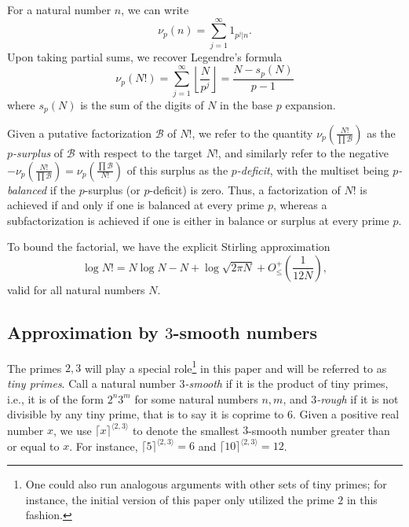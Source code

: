 \documentclass[12pt,a4paper,reqno]{amsart}
\numberwithin{equation}{section}
\theoremstyle{plain}
\theoremstyle{definition}
\newcommand\tuple{{\mathcal B}}
\begin{document}
For a natural number $n$, we can write
\begin{equation}\label{nup-form} 
  \nu_p(n) = \sum_{j=1}^\infty 1_{p^j|n}.
\end{equation}
Upon taking partial sums, we recover Legendre's formula
\begin{equation}\label{legendre}
  \nu_p(N!) = \sum_{j=1}^\infty \left\lfloor \frac{N}{p^j} \right\rfloor = \frac{N - s_p(N)}{p-1}
\end{equation}
where $s_p(N)$ is the sum of the digits of $N$ in the base $p$ expansion.

Given a putative factorization $\tuple$ of $N!$,  
we refer to the quantity $\nu_p\left( \frac{N!}{\prod \tuple} \right)$ as the \emph{$p$-surplus} of $\tuple$ with respect to the target $N!$, and similarly refer to the negative $-\nu_p\left( \frac{N!}{\prod \tuple} \right) = \nu_p\left( \frac{\prod \tuple}{N!} \right)$ of this surplus as the \emph{$p$-deficit}, with the multiset being \emph{$p$-balanced} if the $p$-surplus (or $p$-deficit) is zero.  Thus, a factorization of $N!$ is achieved if and only if one is balanced at every prime $p$, whereas a subfactorization is achieved if one is either in balance or surplus at every prime $p$.

To bound the factorial, we have the explicit Stirling approximation \cite{robbins}
\begin{equation}\label{stirling}
\log N! = N \log N - N + \log \sqrt{2\pi N} + O_\leq^+\left(\frac{1}{12N}\right),
\end{equation}
valid for all natural numbers $N$. 

\subsection{Approximation by \texorpdfstring{$3$}{3}-smooth numbers} 

The primes $2,3$ will play a special role\footnote{One could also run analogous arguments with other sets of tiny primes; for instance, the initial version \cite{tao} of this paper only utilized the prime $2$ in this fashion.} in this paper and will be referred to as \emph{tiny primes}. 
Call a natural number \emph{$3$-smooth} if it is the product of tiny primes, i.e., it is of the form $2^n 3^m$ for some natural numbers $n,m$, and \emph{$3$-rough} if it is not divisible by any tiny prime, that is to say it is coprime to $6$.  Given a positive real number $x$, we use $\lceil x \rceil^{\langle 2,3 \rangle}$ to denote the smallest $3$-smooth number greater than or equal to $x$.  For instance, $\lceil 5 \rceil^{\langle 2,3 \rangle} = 6$ and $\lceil 10 \rceil^{\langle 2,3 \rangle} = 12$.  
\end{document}
